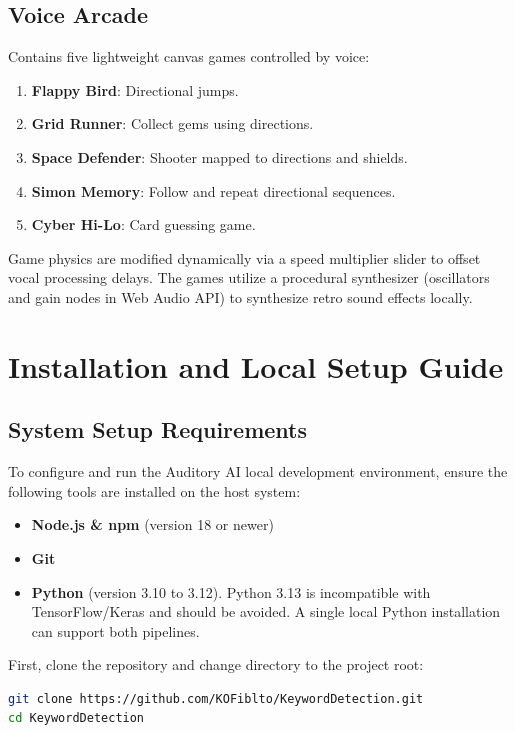 \documentclass[11pt,a4paper]{article}
\begin{document}
\subsection{Voice Arcade}
Contains five lightweight canvas games controlled by voice:
\begin{enumerate}
    \item \textbf{Flappy Bird}: Directional jumps.
    \item \textbf{Grid Runner}: Collect gems using directions.
    \item \textbf{Space Defender}: Shooter mapped to directions and shields.
    \item \textbf{Simon Memory}: Follow and repeat directional sequences.
    \item \textbf{Cyber Hi-Lo}: Card guessing game.
\end{enumerate}
Game physics are modified dynamically via a speed multiplier slider to offset vocal processing delays. The games utilize a procedural synthesizer (oscillators and gain nodes in Web Audio API) to synthesize retro sound effects locally.

\newpage
\section{Installation and Local Setup Guide}

\subsection{System Setup Requirements}
To configure and run the Auditory AI local development environment, ensure the following tools are installed on the host system:
\begin{itemize}
    \item \textbf{Node.js \& npm} (version 18 or newer)
    \item \textbf{Git}
    \item \textbf{Python} (version 3.10 to 3.12). Python 3.13 is incompatible with TensorFlow/Keras and should be avoided. A single local Python installation can support both pipelines.
\end{itemize}

First, clone the repository and change directory to the project root:
\begin{lstlisting}[language=bash]
git clone https://github.com/KOFiblto/KeywordDetection.git
cd KeywordDetection
\end{lstlisting}
\end{document}
